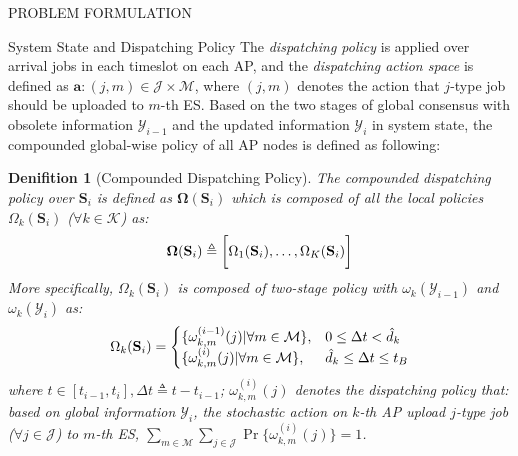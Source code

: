 \documentclass[10pt, conference, letterpaper]{IEEEtran}
\newtheorem{definition}{Denifition}
\newcommand{\define}{\triangleq}
\renewcommand{\vec}{\mathbf}
\DeclarePairedDelimiter{\set}{\{}{\}}
\DeclarePairedDelimiter{\Bracket}{\bigg[}{\bigg]}
\newcommand{\apSet}{\mathcal{K}}
\newcommand{\esSet}{\mathcal{M}}
\newcommand{\jSpace}{\mathcal{J}}
\newcommand{\Stat}{\mathbf{S}}
\newcommand{\Obsv}{\mathcal{Y}}
\newcommand{\Policy}{\mathbf{\Omega}}
\begin{document}
\begin{section}{PROBLEM FORMULATION}
\begin{subsection}{System State and Dispatching Policy}
            The \emph{dispatching policy} is applied over arrival jobs in each timeslot on each AP, and the \emph{dispatching action space} is defined as $\vec{a}: (j, m) \in \jSpace \times \esSet$, where $(j, m)$ denotes the action that $j$-type job should be uploaded to $m$-th ES. Based on the two stages of global consensus with obsolete information $\Obsv_{i-1}$ and the updated information $\Obsv_{i}$ in system state, the compounded global-wise policy of all AP nodes is defined as following:
            \begin{definition}[Compounded Dispatching Policy]
                The compounded dispatching policy over $\Stat_{i}$ is defined as $\Policy(\Stat_{i})$ which is composed of all the local policies $\Omega_k(\Stat_{i})$ ($\forall k\in\apSet$) as:
                \begin{align}
                    \vec{\Omega}(\Stat_{i}) \define \Bracket{\Omega_1(\Stat_{i}), \dots, \Omega_K(\Stat_{i})}
                \end{align}
                More specifically, $\Omega_k(\Stat_{i})$ is composed of two-stage policy with $\omega_k(\Obsv_{i-1})$ and $\omega_k(\Obsv_{i})$ as:
                \begin{align}
                    \Omega_k(\Stat_i) = 
                    \begin{cases}
                        \set{\omega^{(i-1)}_{k,m}(j)|\forall m\in\esSet}, & 0 \leq \Delta{t} < \hat{d}_k
                        \\
                        \set{\omega^{(i)}_{k,m}(j)|\forall m\in\esSet}, & \hat{d}_k \leq \Delta{t} \leq t_B
                    \end{cases}
                \end{align}
                where $t\in[t_{i-1}, t_{i}], \Delta{t} \define t - t_{i-1}$; $\omega^{(i)}_{k,m}(j)$ denotes the dispatching policy that: based on global information $\Obsv_{i}$, the stochastic action on $k$-th AP upload $j$-type job ($\forall j\in\jSpace$) to $m$-th ES, $\sum_{m\in\esSet}\sum_{j\in\jSpace} \Pr\{\omega^{(i)}_{k,m}(j)\}=1$.
            \end{definition}
        \end{subsection}


\end{section}
\end{document}
